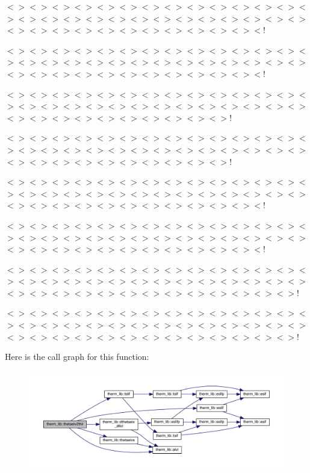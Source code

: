 $<$$>$$<$$>$$<$$>$$<$$>$$<$$>$$<$$>$$<$$>$$<$$>$$<$$>$$<$$>$$<$$>$$<$$>$$<$$>$$<$$>$$<$$>$$<$$>$$<$$>$$<$$>$$<$$>$$<$$>$$<$$>$$<$$>$$<$$>$$<$$>$$<$$>$$<$$>$$<$$>$$<$$>$$<$$>$$<$$>$$<$$>$$<$$>$$<$$>$$<$$>$$<$$>$$<$$>$$<$$>$$<$$>$$<$!

$<$$>$$<$$>$$<$$>$$<$$>$$<$$>$$<$$>$$<$$>$$<$$>$$<$$>$$<$$>$$<$$>$$<$$>$$<$$>$$<$$>$$<$$>$$<$$>$$<$$>$$<$$>$$<$$>$$<$$>$$<$$>$$<$$>$$<$$>$$<$$>$$<$$>$$<$$>$$<$$>$$<$$>$$<$$>$$<$$>$$<$$>$$<$$>$$<$$>$$<$$>$$<$$>$$<$$>$$<$$>$$<$$>$$<$!

$<$$>$$<$$>$$<$$>$$<$$>$$<$$>$$<$$>$$<$$>$$<$$>$$<$$>$$<$$>$$<$$>$$<$$>$$<$$>$$<$$>$$<$$>$$<$$>$$<$$>$$<$$>$$<$$>$$<$$>$$<$$>$$<$$>$$<$$>$$<$$>$$<$$>$$<$$>$$<$$>$$<$$>$$<$$>$$<$$>$$<$$>$$<$$>$$<$$>$$<$$>$$<$$>$$<$$>$$<$$>$!

$<$$>$$<$$>$$<$$>$$<$$>$$<$$>$$<$$>$$<$$>$$<$$>$$<$$>$$<$$>$$<$$>$$<$$>$$<$$>$$<$$>$$<$$>$$<$$>$$<$$>$$<$$>$$<$$>$$<$$>$$<$$>$$<$$>$$<$$>$$<$$>$$<$$>$$<$$>$$<$$>$$<$$>$$<$$>$$<$$>$$<$$>$$<$$>$$<$$>$$<$$>$$<$$>$$<$$>$$<$$>$!

$<$$>$$<$$>$$<$$>$$<$$>$$<$$>$$<$$>$$<$$>$$<$$>$$<$$>$$<$$>$$<$$>$$<$$>$$<$$>$$<$$>$$<$$>$$<$$>$$<$$>$$<$$>$$<$$>$$<$$>$$<$$>$$<$$>$$<$$>$$<$$>$$<$$>$$<$$>$$<$$>$$<$$>$$<$$>$$<$$>$$<$$>$$<$$>$$<$$>$$<$$>$$<$$>$$<$$>$$<$$>$$<$$>$$<$!

$<$$>$$<$$>$$<$$>$$<$$>$$<$$>$$<$$>$$<$$>$$<$$>$$<$$>$$<$$>$$<$$>$$<$$>$$<$$>$$<$$>$$<$$>$$<$$>$$<$$>$$<$$>$$<$$>$$<$$>$$<$$>$$<$$>$$<$$>$$<$$>$$<$$>$$<$$>$$<$$>$$<$$>$$<$$>$$<$$>$$<$$>$$<$$>$$<$$>$$<$$>$$<$$>$$<$$>$$<$$>$$<$$>$$<$!

$<$$>$$<$$>$$<$$>$$<$$>$$<$$>$$<$$>$$<$$>$$<$$>$$<$$>$$<$$>$$<$$>$$<$$>$$<$$>$$<$$>$$<$$>$$<$$>$$<$$>$$<$$>$$<$$>$$<$$>$$<$$>$$<$$>$$<$$>$$<$$>$$<$$>$$<$$>$$<$$>$$<$$>$$<$$>$$<$$>$$<$$>$$<$$>$$<$$>$$<$$>$$<$$>$$<$$>$$<$$>$$<$$>$$<$$>$$<$$>$!

$<$$>$$<$$>$$<$$>$$<$$>$$<$$>$$<$$>$$<$$>$$<$$>$$<$$>$$<$$>$$<$$>$$<$$>$$<$$>$$<$$>$$<$$>$$<$$>$$<$$>$$<$$>$$<$$>$$<$$>$$<$$>$$<$$>$$<$$>$$<$$>$$<$$>$$<$$>$$<$$>$$<$$>$$<$$>$$<$$>$$<$$>$$<$$>$$<$$>$$<$$>$$<$$>$$<$$>$$<$$>$$<$$>$$<$$>$$<$$>$! 

Here is the call graph for this function\+:\nopagebreak
\begin{figure}[H]
\begin{center}
\leavevmode
\includegraphics[width=350pt]{namespacetherm__lib_a567e8e6a001cab2a0991a88f7b7fc28f_cgraph}
\end{center}
\end{figure}


